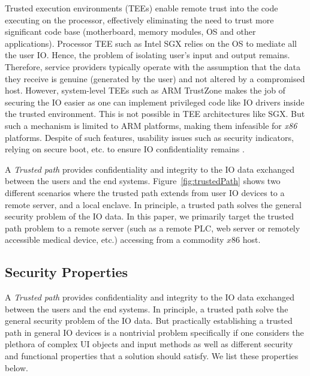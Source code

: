 Trusted execution environments (TEEs) enable remote trust into the code executing on the processor, effectively eliminating the need to trust more significant code base (motherboard, memory modules, OS and other applications). Processor TEE such as Intel SGX relies on the OS to mediate all the user IO. Hence, the problem of isolating user's input and output remains. Therefore, service providers typically operate with the assumption that the data they receive is genuine (generated by the user) and not altered by a compromised host. However, system-level TEEs such as ARM TrustZone makes the job of securing the IO easier as one can implement privileged code like IO drivers inside the trusted environment. This is not possible in TEE architectures like SGX. But such a mechanism is limited to ARM platforms, making them infeasible for \emph{x86} platforms. Despite of such features, usability issues such as security indicators, relying on secure boot, etc. to ensure IO confidentiality remains .

A \emph{Trusted path} provides confidentiality and integrity to the IO data exchanged between the users and the end systems. Figure~\ref{fig:trustedPath} shows two different scenarios where the trusted path extends from user IO devices to \one a remote server, and \two a local enclave. In principle, a trusted path solves the general security problem of the IO data. 
In this paper, we primarily target the trusted path problem to a remote server (such as a remote PLC, web server or remotely accessible medical device, etc.) accessing from a commodity $x86$ host. 

\iffalse
\subsection{Security Properties}

A \emph{Trusted path} provides confidentiality and integrity to the IO data exchanged between the users and the end systems. In principle, a trusted path solve the general security problem of the IO data. But practically establishing a trusted path in general IO devices is a nontrivial problem specifically if one considers the plethora of complex UI objects and input methods as well as different security and functional properties that a solution should satisfy. We list these properties below. 


